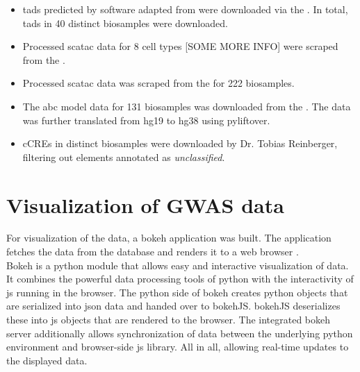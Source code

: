 \begin{itemize}
    \item {} \acp{tad} predicted by software adapted from \textcite{dixonTopologicalDomainsMammalian2012} were downloaded via the . In total, \acp{tad} in 40 distinct biosamples were downloaded.

    \item {} Processed sc\ac{atac} data for 8 cell types [SOME MORE INFO] were scraped from the .

    \item {} Processed \ac{sc}\ac{atac} data was scraped from the  for 222 biosamples.

    \item {} The \ac{abc} model data for 131 biosamples was downloaded from the . The data was further translated from \ac{hg19} to \ac{hg38} using pyliftover.

    \item {} \acp{cCRE} in distinct biosamples were downloaded by Dr. Tobias Reinberger, filtering out elements annotated as \textit{unclassified}.
\end{itemize}

\section{Visualization of GWAS data}
\label{sec:gwas_vis}
For visualization of the data, a bokeh application was built. The application fetches the data from the database and renders it to a web browser \cite{bokehdevelopmentteamBokehPythonLibrary2022}.\\
Bokeh is a python module that allows easy and interactive visualization of data. It combines the powerful data processing tools of python with the interactivity of \ac{js} running in the browser. The python side of bokeh creates python objects that are serialized into \ac{json} data and handed over to bokehJS. bokehJS deserializes these into \ac{js} objects that are rendered to the browser. The integrated bokeh server additionally allows synchronization of data between the underlying python environment and browser-side \ac{js} library. All in all, allowing real-time updates to the displayed data.

